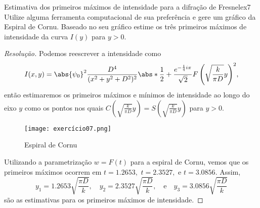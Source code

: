 \begin{exercício}{Estimativa dos primeiros máximos de intensidade para a difração de Fresnel}{ex7}
    Utilize alguma ferramenta computacional de sua preferência e gere um gráfico da Espiral de Cornu. Baseado no seu gráfico estime os três primeiros máximos de intensidade da curva \(I(y)\) para \(y > 0.\)
\end{exercício}
\begin{proof}[Resolução]
    Podemos reescrever a intensidade como
    \begin{equation*}
        I(x,y) = \abs{\psi_0}^2 \frac{D^4}{(x^2 + y^2 + D^2)^2} \abs*{\frac12 + \frac{e^{-\frac14 i\pi}}{\sqrt{2}} F\left(\sqrt{\frac{k}{\pi D}} y\right)}^2,
    \end{equation*}
    então estimaremos os primeiros máximos e mínimos de intensidade ao longo do eixo \(y\) como os pontos nos quais \(C\left(\sqrt{\frac{k}{\pi D}} y\right) = S\left(\sqrt{\frac{k}{\pi D}} y\right)\) para \(y > 0\).
    \begin{figure}[h]
        \centering
        \texttt{[image: exercício07.png]}
        \caption{Espiral de Cornu}
    \end{figure}

    Utilizando a parametrização \(w = F(t)\) para a espiral de Cornu, vemos que os primeiros máximos ocorrem em \(t = 1.2653,\) \(t = 2.3527,\) e \(t = 3.0856.\) Assim, 
    \begin{equation*}
        y_1 = 1.2653\sqrt{\frac{\pi D}{k}},\quad
        y_2 = 2.3527\sqrt{\frac{\pi D}{k}},\quad\text{e}\quad
        y_3 = 3.0856\sqrt{\frac{\pi D}{k}}
    \end{equation*}
    são as estimativas para os primeiros máximos de intensidade.
\end{proof}
